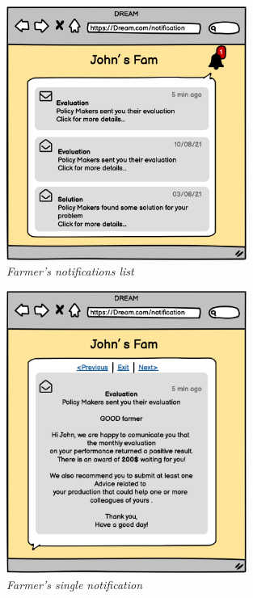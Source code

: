 \begin{figure}[H]
    \begin{center}
    \includegraphics[width=0.7\textwidth]{mocups/Notifications.png}
    \caption{\emph{Farmer's notifications list}}
    \label{fig:notificationList}
    \end{center}
\end{figure}

\begin{figure}[H]
    \begin{center}
    \includegraphics[width=0.7\textwidth]{mocups/Notification.png}
    \caption{\emph{Farmer's single notification}}
    \label{fig:singleNotification}
    \end{center}
\end{figure}

